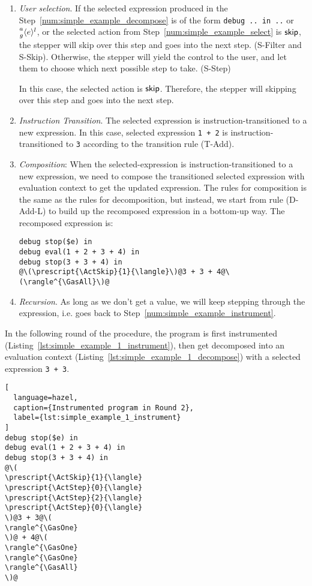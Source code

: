\begin{enumerate}
\item \emph{User selection}. If the selected expression produced in
  the Step~\ref{num:simple_example_decompose} is of the form
  \lstinline[language=hazel]{debug .. in ..} or
  \(\Residue{a}{g}{l}{e}\), or the selected action from
  Step~\ref{num:simple_example_select} is \(\ActSkip\), the stepper
  will skip over this step and goes into the next step. (S-Filter and
  S-Skip). Otherwise, the stepper will yield the control to the user,
  and let them to choose which next possible step to take. (S-Step)

  In this case, the selected action is \(\ActSkip\). Therefore, the stepper
  will skipping over this step and goes into the next step.

\item \emph{Instruction Transition}. The selected expression is
  instruction-transitioned to a new expression. In this case, selected
  expression \lstinline[language=hazel]{1 + 2} is
  instruction-transitioned to \lstinline[language=hazel]{3} according
  to the transition rule (T-Add).

\item \emph{Composition}: When the selected-expression is
  instruction-transitioned to a new expression, we need to compose the
  transitioned selected expression with evaluation context to get the
  updated expression. The rules for composition is the same as the
  rules for decomposition, but instead, we start from rule (D-Add-L)
  to build up the recomposed expression in a bottom-up way. The
  recomposed expression is:
  \begin{lstlisting}[language=hazel]
debug stop($e) in
debug eval(1 + 2 + 3 + 4) in
debug stop(3 + 3 + 4) in
@\(\prescript{\ActSkip}{1}{\langle}\)@3 + 3 + 4@\(\rangle^{\GasAll}\)@\end{lstlisting}

\item \emph{Recursion}. As long as we don't get a value, we will keep
  stepping through the expression, i.e. goes back to
  Step~\ref{num:simple_example_instrument}.
\end{enumerate}

In the following round of the procedure, the program is first
instrumented (Listing~\ref{lst:simple_example_1_instrument}), then get
decomposed into an evaluation context
(Listing~\ref{lst:simple_example_1_decompose}) with a selected
expression \lstinline[language=hazel]{3 + 3}.

\begin{lstlisting}[
  language=hazel,
  caption={Instrumented program in Round 2},
  label={lst:simple_example_1_instrument}
]
debug stop($e) in
debug eval(1 + 2 + 3 + 4) in
debug stop(3 + 3 + 4) in
@\(
\prescript{\ActSkip}{1}{\langle}
\prescript{\ActStep}{0}{\langle}
\prescript{\ActStep}{2}{\langle}
\prescript{\ActStep}{0}{\langle}
\)@3 + 3@\(
\rangle^{\GasOne}
\)@ + 4@\(
\rangle^{\GasOne}
\rangle^{\GasOne}
\rangle^{\GasAll}
\)@\end{lstlisting}

